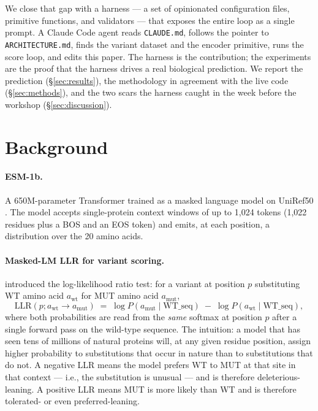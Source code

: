 \documentclass{article}
\begin{document}
We close that gap with a harness --- a set of opinionated configuration
files, primitive functions, and validators --- that exposes the entire
loop as a single prompt. A Claude Code agent reads \texttt{CLAUDE.md},
follows the pointer to \texttt{ARCHITECTURE.md}, finds the variant
dataset and the encoder primitive, runs the score loop, and edits this
paper. The harness is the contribution; the experiments are the proof
that the harness drives a real biological prediction. We report the
prediction (\S\ref{sec:results}), the methodology in agreement with the
live code (\S\ref{sec:methods}), and the two scars the harness caught in
the week before the workshop (\S\ref{sec:discussion}).

\section{Background}
\label{sec:background}

\paragraph{ESM-1b.} A 650M-parameter Transformer trained as a masked
language model on UniRef50 \citep{rives2021esm}. The model accepts
single-protein context windows of up to 1{,}024 tokens (1{,}022
residues plus a BOS and an EOS token) and emits, at each position, a
distribution over the 20 amino acids.

\paragraph{Masked-LM LLR for variant scoring.} \citet{brandes2023}
introduced the log-likelihood ratio test: for a variant at position
\(p\) substituting WT amino acid \(a_{\mathrm{wt}}\) for MUT amino acid
\(a_{\mathrm{mut}}\),
\begin{equation}
  \mathrm{LLR}(p; a_{\mathrm{wt}} \to a_{\mathrm{mut}})
  \;=\; \log P(a_{\mathrm{mut}} \mid \mathrm{WT\_seq})
  \;-\; \log P(a_{\mathrm{wt}} \mid \mathrm{WT\_seq}),
  \label{eq:llr}
\end{equation}
where both probabilities are read from the \emph{same} softmax at
position \(p\) after a single forward pass on the wild-type sequence.
The intuition: a model that has seen tens of millions of natural
proteins will, at any given residue position, assign higher probability
to substitutions that occur in nature than to substitutions that do not.
A negative LLR means the model prefers WT to MUT at that site in that
context --- i.e., the substitution is unusual --- and is therefore
deleterious-leaning. A positive LLR means MUT is more likely than WT and
is therefore tolerated- or even preferred-leaning.
\end{document}
